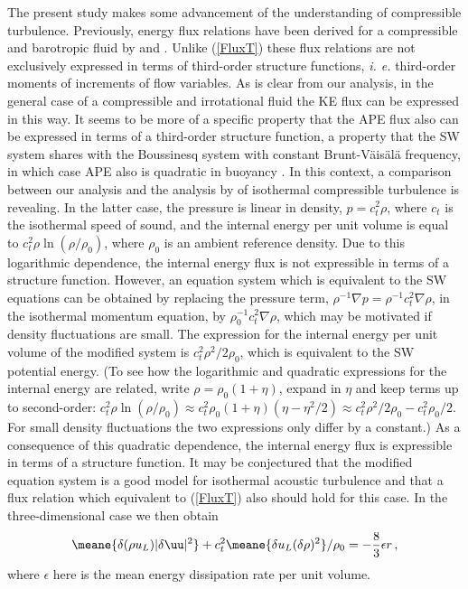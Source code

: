  The present study makes some advancement of the understanding of compressible turbulence. Previously, energy flux relations  have
 been derived  for a compressible and barotropic fluid by \cite{Falkovich2010} and \cite{Galtier2011}.  Unlike (\ref{FluxT}) these flux relations are not exclusively expressed in terms of third-order structure functions, {\em i. e.} third-order moments of increments of flow variables.
As is clear from our analysis, in the general case of a compressible and irrotational fluid the KE flux can be expressed in this way.  It seems to be more of a specific property that the APE flux also can be expressed in terms of a third-order structure function, a property that the SW system shares with the Boussinesq system with constant Brunt-V\"ais\"al\"a frequency, in which case APE also is quadratic in buoyancy \citep[]{Augier2012}.
In this context,  a comparison between our analysis and the analysis  by
\cite{Galtier2011} of  isothermal compressible turbulence  is revealing. In the
latter case, the pressure is linear in density, $ p = c_t^2 \rho $, where $ c_t
$ is the isothermal speed of sound, and the internal energy per unit volume is
equal to $ c_t^2 \rho \ln (\rho/ \rho_0) $, where $ \rho_0 $ is an ambient
reference density. Due to this  logarithmic dependence, the internal energy
flux is not expressible in terms of a structure function. However, an equation
system which is equivalent to the SW equations can be obtained by replacing the
pressure term, $ \rho^{-1} \nabla p = \rho^{-1} c_t^{2} \nabla \rho $, in the
isothermal momentum equation, by $ \rho_{0}^{-1} c_t^{2} \nabla \rho $, which
may be motivated if density fluctuations are small. The expression for the
internal energy per unit volume of the modified system is  $ c_t^2
\rho^2/2\rho_{0} $, which is equivalent to the SW potential energy. (To see how the logarithmic and quadratic expressions for the internal energy are
 related, write $ \rho = \rho_0(1+\eta) $, expand in $ \eta $ and keep  terms up to second-order:
 $ c_t^2\rho \ln(\rho/\rho_0) \approx c_t^2 \rho_0(1+\eta)(\eta - \eta^2/2) \approx   c_t^2 \rho^2/2 \rho_0 - c_t^2 \rho_0/2 $.
 For small density fluctuations the two expressions only differ by a constant.) As a consequence of this quadratic dependence, the internal energy flux is expressible in terms of a structure function. It may be conjectured that the modified equation system is a good model for isothermal acoustic turbulence and that a flux relation which  equivalent to (\ref{FluxT}) also should hold for this case. In the three-dimensional case we then obtain
 \begin{equation}
\meane{ \delta (\rho u_L)    |\delta \uu|^2  }
+ c_t^2\meane{ \delta u_L(\delta \rho)^2  } /\rho_0 = - \frac{8}{3} \epsilon r \, ,\label{eq_Kolmo3}
\end{equation}
where  $ \epsilon $ here is the mean energy dissipation rate per unit volume.

